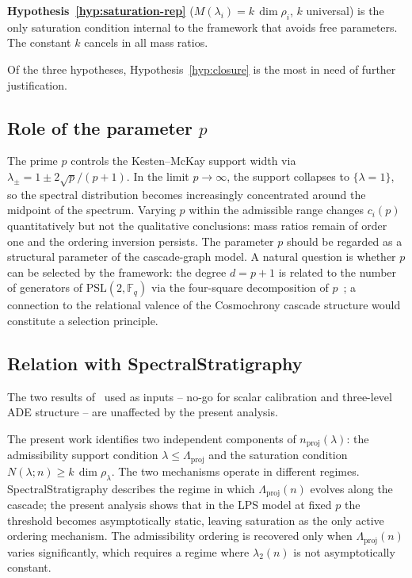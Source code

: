 \documentclass[12pt, a4paper]{article}
\theoremstyle{plain}
\theoremstyle{definition}
\theoremstyle{remark}
\begin{document}
      \textbf{Hypothesis~\ref{hyp:saturation-rep}} ($M(\lambda_i) = k\,\dim\rho_i$,
      $k$ universal) is the only saturation condition internal to the framework that
      avoids free parameters.
      The constant $k$ cancels in all mass ratios.

      Of the three hypotheses, Hypothesis~\ref{hyp:closure} is the most in need of
      further justification.

    \subsection{Role of the parameter $p$}
      \label{sec:disc:p}

      The prime $p$ controls the Kesten--McKay support width via
      $\lambda_\pm = 1 \pm 2\sqrt{p}/(p+1)$.
      In the limit $p \to \infty$, the support collapses to $\{\lambda = 1\}$, so
      the spectral distribution becomes increasingly concentrated around the
      midpoint of the spectrum.
      Varying $p$ within the admissible range changes $c_i(p)$ quantitatively but
      not the qualitative conclusions: mass ratios remain of order one and the
      ordering inversion persists.
      The parameter $p$ should be regarded as a structural parameter of the
      cascade-graph model.
      A natural question is whether $p$ can be selected by the framework:
      the degree $d = p+1$ is related to the number of generators of
      $\mathrm{PSL}(2,\mathbb{F}_q)$ via the four-square decomposition of
      $p$~\cite{LPS1988}; a connection to the relational valence of the Cosmochrony
      cascade structure would constitute a selection principle.

    \subsection{Relation with SpectralStratigraphy}
      \label{sec:disc:stratigraphy}

      The two results of~\cite{Beau2026a4} used as inputs -- no-go for
      scalar calibration and three-level ADE structure -- are unaffected by the
      present analysis.

      The present work identifies two independent components of
      $n_{\mathrm{proj}}(\lambda)$: the admissibility support condition
      $\lambda \leq \Lambda_{\mathrm{proj}}$ and the saturation condition
      $N(\lambda; n) \geq k\,\dim\rho_\lambda$.
      The two mechanisms operate in different regimes.
      SpectralStratigraphy describes the regime in which $\Lambda_{\mathrm{proj}}(n)$
      evolves along the cascade; the present analysis shows that in the LPS model
      at fixed $p$ the threshold becomes asymptotically static, leaving saturation
      as the only active ordering mechanism.
      The admissibility ordering is recovered only when $\Lambda_{\mathrm{proj}}(n)$
      varies significantly, which requires a regime where $\lambda_2(n)$ is not
      asymptotically constant.
\end{document}
